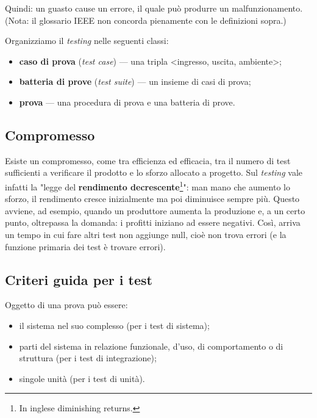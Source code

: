 \documentclass[a4paper]{article}
\begin{document}
		
Quindi: un guasto cause un errore, il quale può produrre un malfunzionamento. (Nota: il glossario IEEE non concorda pienamente con le definizioni sopra.)
		
Organizziamo il \emph{testing} nelle seguenti classi:
		
	\begin{itemize}
		
			
	\item \textbf{caso di prova} (\emph{test case}) --- una tripla \textless{}ingresso, uscita, ambiente\textgreater{};
			
	\item \textbf{batteria di prove} (\emph{test suite}) --- un insieme di casi di prova;
			
	\item \textbf{prova} --- una procedura di prova e una batteria di prove.
		
	\end{itemize}


		
	\subsection{Compromesso}

		
Esiste un compromesso, come tra efficienza ed efficacia, tra il numero di test sufficienti a verificare il prodotto e lo sforzo allocato a progetto. Sul \emph{testing} vale infatti la "legge del \textbf{rendimento decrescente}\footnote{In inglese diminishing returns.}": man mano che aumento lo sforzo, il rendimento cresce inizialmente ma poi diminuisce sempre più. Questo avviene, ad esempio, quando un produttore aumenta la produzione e, a un certo punto, oltrepassa la domanda: i profitti iniziano ad essere negativi. Così, arriva un tempo in cui fare altri test non aggiunge null, cioè non trova errori (e la funzione primaria dei test è trovare errori).

		
	\subsection{Criteri guida per i test}

		
Oggetto di una prova può essere:
		
	\begin{itemize}
		
			
	\item il sistema nel suo complesso (per i test di sistema);
			
	\item parti del sistema in relazione funzionale, d'uso, di comportamento o di struttura (per i test di integrazione);
			
	\item singole unità (per i test di unità).
		
	\end{itemize}
\end{document}
